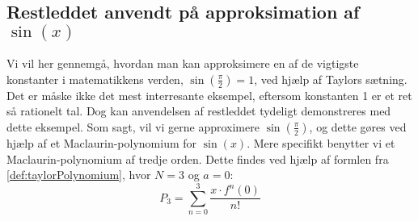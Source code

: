 \subsection*{Restleddet anvendt på approksimation af $\sin(x)$}
Vi vil her gennemgå, hvordan man kan approksimere en af de vigtigste konstanter i matematikkens verden, $\sin(\frac{\pi}{2})=1$, ved hjælp af Taylors sætning. Det er måske ikke det mest interresante eksempel, eftersom konstanten 1 er et ret så rationelt tal. Dog kan anvendelsen af restleddet tydeligt demonstreres med dette eksempel.
Som sagt, vil vi gerne approximere $\sin(\frac{\pi}{2})$, og dette gøres ved hjælp af et Maclaurin-polynomium for $\sin(x)$. Mere specifikt benytter vi et Maclaurin-polynomium af tredje orden.
Dette findes ved hjælp af formlen fra \ref{def:taylorPolynomium}, hvor $N=3$ og $a=0$:
\begin{equation}
	P_3=\sum^{3}_{n=0}\frac{x \cdot f^n(0)}{n!}
\end{equation}
